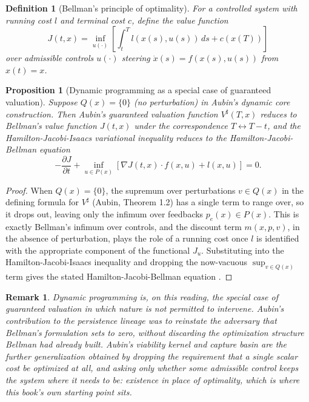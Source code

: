 \documentclass[11pt]{report}
\newtheorem{proposition}{Proposition}[chapter]
\newtheorem{definition}{Definition}[chapter]
\newtheorem{remark}{Remark}[chapter]
\begin{document}
\begin{definition}[Bellman's principle of optimality]
For a controlled system with running cost $l$ and terminal cost $c$,
define the value function
\[
J(t,x) = \inf_{u(\cdot)} \left[ \int_t^T l(x(s), u(s))\, ds + c(x(T)) \right]
\]
over admissible controls $u(\cdot)$ steering $\dot x(s) = f(x(s), u(s))$
from $x(t) = x$.
\end{definition}

\begin{proposition}[Dynamic programming as a special case of guaranteed valuation]
Suppose $Q(x) = \{0\}$ (no perturbation) in Aubin's dynamic core
construction. Then Aubin's guaranteed valuation function $V^\sharp(T,x)$
reduces to Bellman's value function $J(t,x)$ under the correspondence
$T \leftrightarrow T - t$, and the Hamilton-Jacobi-Isaacs variational
inequality reduces to the Hamilton-Jacobi-Bellman equation
\[
-\frac{\partial J}{\partial t} + \inf_{u \in P(x)}\left[ \nabla J(t,x) \cdot f(x,u) + l(x,u) \right] = 0.
\]
\end{proposition}
\begin{proof}
When $Q(x) = \{0\}$, the supremum over perturbations $v \in Q(x)$ in the
defining formula for $V^\sharp$ (Aubin, Theorem 1.2) has a single term
to range over, so it drops out, leaving only the infimum over feedbacks
$p_e(x) \in P(x)$. This is exactly Bellman's infimum over controls, and
the discount term $m(x,p,v)$, in the absence of perturbation, plays the
role of a running cost once $l$ is identified with the appropriate
component of the functional $J_u$. Substituting into the
Hamilton-Jacobi-Isaacs inequality and dropping the now-vacuous
$\sup_{v \in Q(x)}$ term gives the stated Hamilton-Jacobi-Bellman
equation \cite{bellman1957}.
\end{proof}

\begin{remark}
Dynamic programming is, on this reading, the special case of guaranteed
valuation in which nature is not permitted to intervene. Aubin's
contribution to the persistence lineage was to reinstate the adversary
that Bellman's formulation sets to zero, without discarding the
optimization structure Bellman had already built. Aubin's viability
kernel and capture basin are the further generalization obtained by
dropping the requirement that a single scalar cost be optimized at all,
and asking only whether \emph{some} admissible control keeps the system
where it needs to be: existence in place of optimality, which is
where this book's own starting point sits.
\end{remark}
\end{document}

